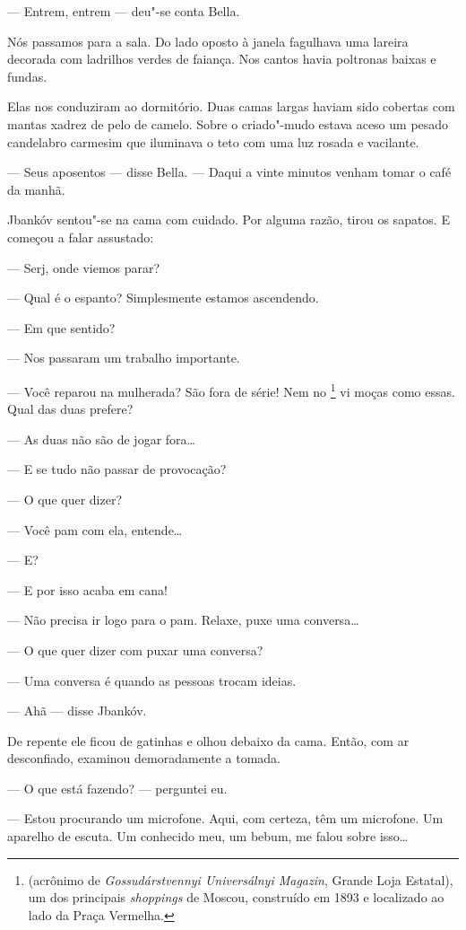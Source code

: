 --- Entrem, entrem --- deu"-se conta Bella.

Nós passamos para a sala. Do lado oposto à janela fagulhava uma lareira
decorada com ladrilhos verdes de faiança. Nos cantos havia poltronas
baixas e fundas.

Elas nos conduziram ao dormitório. Duas camas largas haviam sido
cobertas com mantas xadrez de pelo de camelo. Sobre o criado"-mudo estava
aceso um pesado candelabro carmesim que iluminava o teto com uma luz
rosada e vacilante.

--- Seus aposentos --- disse Bella. --- Daqui a
vinte minutos venham tomar o café da manhã.

Jbankóv sentou"-se na cama com cuidado. Por alguma razão, tirou os
sapatos. E começou a falar assustado:

--- Serj, onde viemos parar?

--- Qual é o espanto? Simplesmente estamos ascendendo.

--- Em que sentido?

--- Nos passaram um trabalho importante.

--- Você reparou na mulherada? São fora de série! Nem no
\footnote{ (acrônimo de \emph{Gossudárstvennyi Universálnyi
  Magazin}, Grande Loja Estatal), um dos principais \emph{shoppings} de
  Moscou, construído em 1893 e localizado ao lado da Praça Vermelha.} vi
moças como essas. Qual das duas prefere?

--- As duas não são de jogar fora\ldots{}

--- E se tudo não passar de provocação?

--- O que quer dizer?

--- Você pam com ela, entende\ldots{}

--- E?

--- E por isso acaba em cana!

--- Não precisa ir logo para o pam. Relaxe, puxe uma conversa\ldots{}

--- O que quer dizer com puxar uma conversa?

--- Uma conversa é quando as pessoas trocam ideias.

--- Ahã --- disse Jbankóv.

De repente ele ficou de gatinhas e olhou debaixo da cama. Então, com ar
desconfiado, examinou demoradamente a tomada.

--- O que está fazendo? --- perguntei eu.

--- Estou procurando um microfone. Aqui, com certeza, têm um
microfone. Um aparelho de escuta. Um conhecido meu, um bebum, me falou
sobre isso\ldots{}


